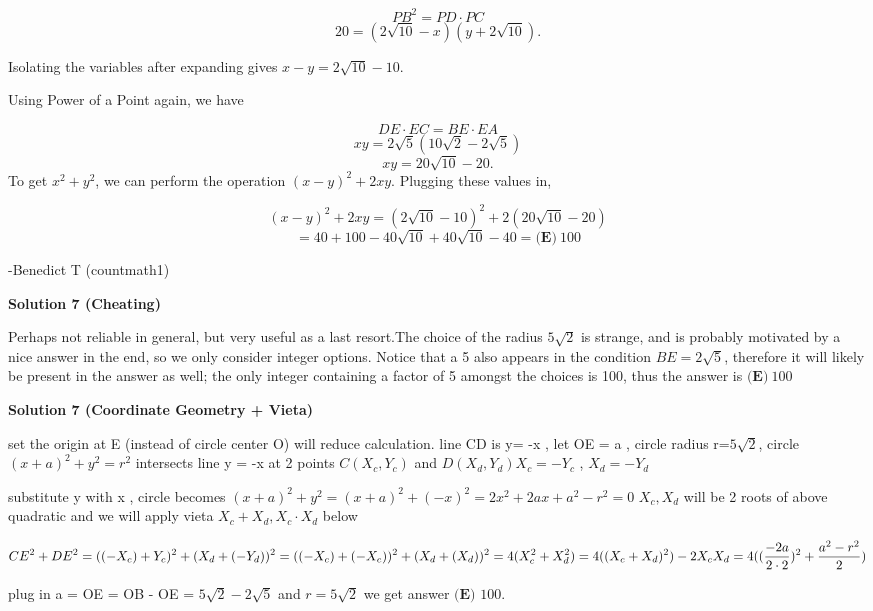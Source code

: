 \begin{enumerate}
 
 \[PB^2 = PD\cdot PC\]
 \[20 = \left(2\sqrt{10}-x\right)\left(y + 2\sqrt{10}\right).\]

 Isolating the variables after expanding gives $x-y = 2\sqrt{10}-10.$

 Using Power of a Point again, we have 

 
 \[DE\cdot EC = BE\cdot EA\]
 \[xy = 2\sqrt{5}\left(10\sqrt{2}-2\sqrt{5} \right)\]
 \[xy = 20\sqrt{10}-20.\]To get $x^2 + y^2$, we can perform the operation $(x-y)^2 + 2xy$. Plugging these values in, 

 
 \[(x-y)^2 + 2xy = \left(2\sqrt{10}-10\right)^2 + 2\left(20\sqrt{10}-20\right)\]
 \[= 40 + 100 - 40\sqrt{10} + 40\sqrt{10} - 40 = \boxed{\textbf{(E)}\ 100}\]

 -Benedict T (countmath1)

 



\textbf{Solution 7 (Cheating)}

Perhaps not reliable in general, but very useful as a last resort.The choice of the radius $5\sqrt2$ is strange, and is probably motivated by a nice answer in the end, so we only consider integer options. Notice that a 5 also appears in the condition $BE=2\sqrt5$, therefore it will likely be present in the answer as well; the only integer containing a factor of 5 amongst the choices is 100, thus the answer is  $\boxed{\textbf{(E)}\ 100}$




\textbf{Solution 7 (Coordinate Geometry + Vieta)}

set the origin at E (instead of circle center O) will reduce calculation. line CD is y= -x ,   let OE = a , circle radius r=$5\sqrt{2}$,  circle $(x + a)^2 + y^2 = r^2$  intersects line y = -x at 2 points $C(X_c, Y_c)$ and $D(X_d, Y_d)$$X_c = -Y_c$ , $X_d = -Y_d$ 

 substitute y with x , circle becomes  $(x + a)^2 + y^2 = (x + a)^2 + (-x)^2 = 2x^2 + 2ax + a^2 - r^2 = 0$
$X_c , X_d$ will be 2 roots of above quadratic and we will apply vieta $X_c+ X_d , X_c \cdot X_d$ below

 
 \[CE^2 + DE^2 = ( (-X_c) + Y_c)^2 +  ( X_d + (- Y_d) )^2 \\ = ( (-X_c) + (-X_c))^2 +  ( X_d + (X_d) )^2  \\ = 4 (X_c^2 + X_d^2) \\ = 4 ((X_c + X_d)^2) -  2X_cX_d \\ = 4 ( (\frac{-2a}{2 \cdot  2})^2 + \frac{a^2- r^2}{2} )\]

 plug in a = OE  = OB - OE  = $5\sqrt{2} - 2 \sqrt{5}$ and $r = 5\sqrt{2}$ we get answer $\boxed{\textbf{(E) }100}$.


\end{enumerate}
